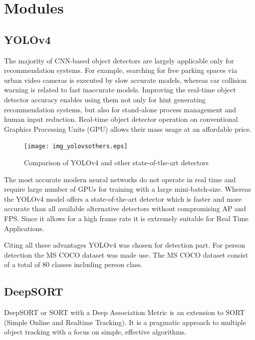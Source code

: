 \documentclass{fisatprojectfinal}
\begin{document}
\section{Modules}
\subsection{YOLOv4}
The majority of CNN-based object detectors are largely applicable only for recommendation systems. For example, searching for free parking spaces via urban video cameras is executed by slow accurate models, whereas car collision warning is related to fast inaccurate models. Improving the real-time object detector accuracy enables using them not only for hint generating recommendation systems, but also for stand-alone process management and human input reduction. Real-time object detector operation on conventional Graphics Processing Units (GPU) allows their mass usage at an affordable price. 

\begin{figure}[h!]
\begin{center}
\texttt{[image: img\_yolovsothers.eps]}
\caption{Comparison of YOLOv4 and other state-of-the-art detectors}
\end{center}
\end{figure}

The most accurate modern neural networks do not operate in real time and require large number of GPUs for training with a large mini-batch-size. Whereas the YOLOv4 model offers a state-of-the-art detector which is faster and more accurate than all available alternative detectors without compromising AP and FPS. Since it allows for a high frame rate it is extremely suitable for Real Time Applications.

Citing all these advantages YOLOv4 was chosen for detection part. For person detection  the MS COCO dataset was made use. The MS COCO dataset consist of a total of 80 classes including person class.

\subsection{DeepSORT}
DeepSORT or SORT with a Deep Association Metric is an extension to SORT (Simple Online and Realtime Tracking). It is a pragmatic approach to multiple object tracking with a focus on simple, effective algorithms. 
\end{document}
